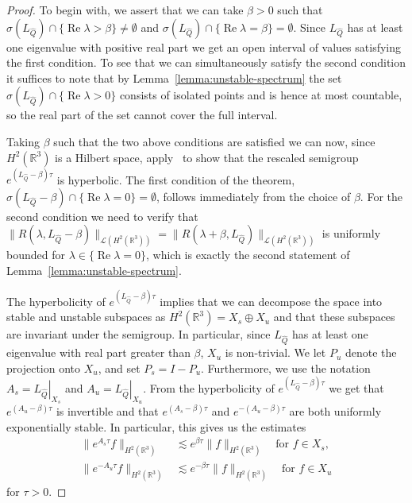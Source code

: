 \documentclass[11pt]{article}
\DeclareMathOperator{\real}{Re}
\begin{document}
\begin{proof}
  To begin with, we assert that we can take \(\beta > 0\) such that
  \(\sigma(L_{\hat{Q}}) \cap \{\real \lambda > \beta\} \neq
  \emptyset\) and
  \(\sigma(L_{\hat{Q}}) \cap \{\real \lambda = \beta\} = \emptyset\).
  Since \(L_{\hat{Q}}\) has at least one eigenvalue with positive real
  part we get an open interval of values satisfying the first
  condition. To see that we can simultaneously satisfy the second
  condition it suffices to note that by
  Lemma~\ref{lemma:unstable-spectrum} the set
  \(\sigma(L_{\hat{Q}}) \cap \{\real \lambda > 0\}\) consists of
  isolated points and is hence at most countable, so the real part of
  the set cannot cover the full interval.

  Taking \(\beta\) such that the two above conditions are satisfied we
  can now, since \(H^{2}(\mathbb{R}^{3})\) is a Hilbert space,
  apply~\cite[Chapter~V, Section~1, Theorem~1.18]{Engel2000} to show
  that the rescaled semigroup \(e^{(L_{\hat{Q}} - \beta)\tau}\) is
  hyperbolic. The first condition of the theorem,
  \(\sigma(L_{\hat{Q}} - \beta) \cap \{\real \lambda = 0\} =
  \emptyset\), follows immediately from the choice of \(\beta\). For
  the second condition we need to verify that
  \(\|R(\lambda, L_{\hat{Q}} - \beta)\|_{\mathcal{L}(H^{2}(\mathbb{R}^{3}))} =
  \|R(\lambda + \beta, L_{\hat{Q}})\|_{\mathcal{L}(H^{2}(\mathbb{R}^{3}))}\) is
  uniformly bounded for \(\lambda \in \{\real \lambda = 0\}\), which
  is exactly the second statement of
  Lemma~\ref{lemma:unstable-spectrum}.

  The hyperbolicity of \(e^{(L_{\hat{Q}} - \beta)\tau}\) implies that
  we can decompose the space into stable and unstable subspaces as
  \(H^{2}(\mathbb{R}^{3}) = X_{s} \oplus X_{u}\) and that these
  subspaces are invariant under the semigroup. In particular, since
  \(L_{\hat{Q}}\) has at least one eigenvalue with real part greater
  than \(\beta\), \(X_{u}\) is non-trivial. We let \(P_{u}\) denote
  the projection onto \(X_{u}\), and set \(P_{s} = I - P_{u}\).
  Furthermore, we use the notation
  \(A_{s} = \left.L_{\hat{Q}}\right\vert_{X_{s}}\) and
  \(A_{u} = \left.L_{\hat{Q}}\right\vert_{X_{u}}\). From the
  hyperbolicity of \(e^{(L_{\hat{Q}} - \beta)\tau}\) we get that
  \(e^{(A_{u} - \beta)\tau}\) is invertible and that
  \(e^{(A_{s} - \beta)\tau}\) and \(e^{-(A_{u} - \beta)\tau}\) are
  both uniformly exponentially stable. In particular, this gives us
  the estimates
  \begin{align*}
    \|e^{A_{s}\tau}f\|_{H^{2}(\mathbb{R}^{3})} &\lesssim e^{\beta \tau}\|f\|_{H^{2}(\mathbb{R}^{3})} \quad\text{for }f \in X_{s},\\
    \|e^{-A_{u}\tau}f\|_{H^{2}(\mathbb{R}^{3})} &\lesssim e^{-\beta \tau}\|f\|_{H^{2}(\mathbb{R}^{3})} \quad\text{for }f \in X_{u}
  \end{align*}
  for \(\tau > 0\).


\end{proof}
\end{document}
